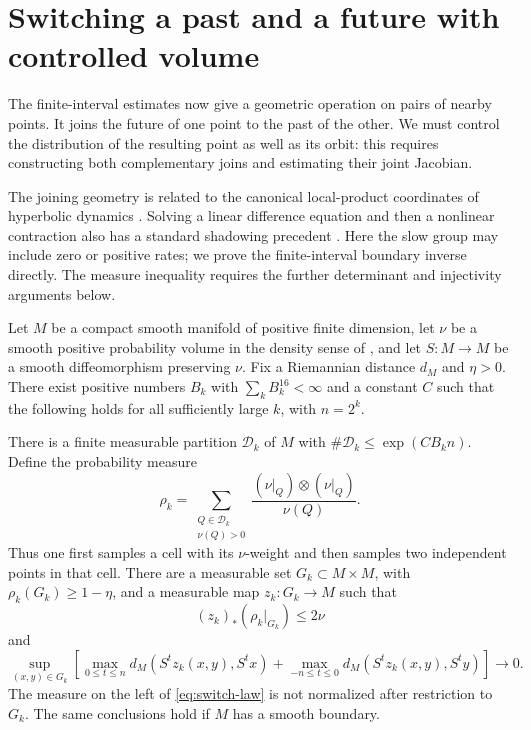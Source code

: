 \section{Switching a past and a future with controlled volume}
\label{sec:switching}

The finite-interval estimates now give a geometric operation on pairs of
nearby points.  It joins the future of one point to the past of the other.
We must control the distribution of the resulting point as well as its
orbit: this requires constructing both complementary joins and estimating
their joint Jacobian.

The joining geometry is related to the canonical local-product
coordinates of hyperbolic dynamics \cite[\S I.7]{Smale1967}.
Solving a linear difference equation and then a nonlinear contraction
also has a standard shadowing precedent
\cite[Lemma~3.2 and Proposition~4.1]{ChowLinPalmer1989}.
Here the slow group may include zero or positive rates; we prove the
finite-interval boundary inverse directly. The measure inequality
requires the further determinant and injectivity arguments below.

\begin{theorem}\label{thm:switching}
Let $M$ be a compact smooth manifold of positive finite dimension, let
$\nu$ be a smooth positive probability volume in the density sense of
, and let $S:M\to M$
be a smooth diffeomorphism preserving $\nu$.  Fix a Riemannian distance
$d_M$ and $\eta>0$.  There exist positive numbers $B_k$ with
$\sum_k B_k^{16}<\infty$ and a constant $C$ such that the following
holds for all sufficiently large $k$, with $n=2^k$.

There is a finite measurable partition $\mathcal D_k$ of $M$ with
$\#\mathcal D_k\le \exp(CB_kn)$.  Define the probability measure
\begin{equation}\label{eq:pair-law}
 \rho_k=\sum_{\substack{Q\in\mathcal D_k\\\nu(Q)>0}}
       \frac{(\nu|_Q)\otimes(\nu|_Q)}{\nu(Q)}.
\end{equation}
Thus one first samples a cell with its $\nu$-weight and then samples
two independent points in that cell.  There are a measurable set
$G_k\subset M\times M$, with $\rho_k(G_k)\ge1-\eta$, and a measurable
map $z_k:G_k\to M$ such that
\begin{equation}\label{eq:switch-law}
 (z_k)_*(\rho_k|_{G_k})\le 2\nu
\end{equation}
and
\begin{equation}\label{eq:switch-shadow}
 \sup_{(x,y)\in G_k}\left[
 \max_{0\le t\le n}d_M(S^t z_k(x,y),S^t x)
 +\max_{-n\le t\le0}d_M(S^t z_k(x,y),S^t y)
 \right]\longrightarrow0.
\end{equation}
The measure on the left of \eqref{eq:switch-law} is not normalized
after restriction to $G_k$.  The same conclusions hold if $M$ has a
smooth boundary.
\end{theorem}

